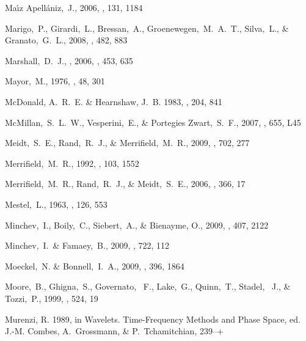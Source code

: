 \begin{thebibliography}{99}
  Ma{\'{\i}}z Apell{\'a}niz,~J., 2006,
  \aj, 131, 1184

  Marigo,~P., Girardi,~L., Bressan,~A., Groenewegen,~M.~A.~T., Silva,~L., \& Granato,~G.~L., 2008,
  \aap, 482, 883

  Marshall,~D.~J., \etal, 2006,
  \aap, 453, 635

  Mayor,~M., 1976,
  \aap, 48, 301

{McDonald}, A.~R.~E. \& {Hearnshaw}, J.~B. 1983, \mnras, 204, 841

  McMillan,~S.~L.~W., Vesperini,~E., \& Portegies Zwart,~S.~F., 2007,
  \apjl, 655, L45

  Meidt,~S.~E., Rand,~R.~J., \& Merrifield,~M.~R., 2009,
  \apj, 702, 277

  Merrifield,~M.~R., 1992, \aj, 103, 1552

  Merrifield,~M.~R., Rand,~R.~J., \& Meidt,~S.~E., 2006,
  \mnras, 366, 17

  Mestel,~L., 1963,
  \mnras, 126, 553

  Minchev,~I., Boily,~C., Siebert,~A., \& Bienayme, O., 2009,
  \mnras, 407, 2122

  Minchev,~I.~\& Famaey,~B., 2009,
  \apj, 722, 112

  Moeckel,~N. \& Bonnell,~I.~A., 2009,
  \mnras, 396, 1864

  Moore,~B., Ghigna,~S., Governato, ~F., Lake,~G., Quinn,~T., Stadel, ~J.,  \& Tozzi,~P., 1999, \apj, 524, 19

{Murenzi}, R. 1989, in Wavelets. Time-Frequency Methods and Phase Space, ed.
  J.-M. {Combes}, A.~{Grossmann}, \& P.~{Tchamitchian}, 239--+


\end{thebibliography}
